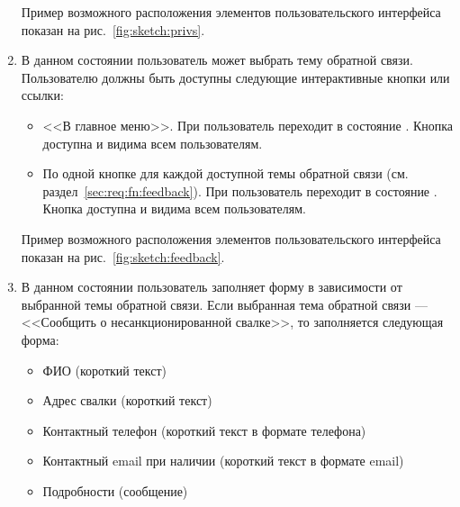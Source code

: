 \begin{enumerate}
            Пример возможного расположения элементов пользовательского интерфейса показан на
            рис.~\ref{fig:sketch:privs}.

        \item \label{itm:req:ui:states:feedback}

            В данном состоянии пользователь может выбрать тему обратной связи.
            Пользователю должны быть доступны следующие интерактивные кнопки или ссылки:
            \begin{itemize}
                \item
                    <<В главное меню>>.
                    При  пользователь переходит в состояние
                    \hyperref[itm:req:ui:states:mainmenu]
                    {}.
                    Кнопка доступна и видима всем пользователям.
                \item
                    По одной кнопке для каждой доступной темы обратной связи
                    (см. раздел~\ref{sec:req:fn:feedback}).
                    При  пользователь переходит в состояние
                    \hyperref[itm:req:ui:states:feedbackx]
                    {}.
                    Кнопка доступна и видима всем пользователям.
            \end{itemize}

            Пример возможного расположения элементов пользовательского интерфейса показан на
            рис.~\ref{fig:sketch:feedback}.

        \item \label{itm:req:ui:states:feedbackx}

            В данном состоянии пользователь заполняет форму в зависимости от выбранной темы
            обратной связи.
            Если выбранная тема обратной связи --- <<Сообщить о несанкционированной свалке>>,
            то заполняется следующая форма:
            \begin{itemize}
                \item
                    ФИО (короткий текст)
                \item
                    Адрес свалки (короткий текст)
                \item
                    Контактный телефон (короткий текст в формате телефона)
                \item
                    Контактный email при наличии (короткий текст в формате email)
                \item
                    Подробности (сообщение)
            \end{itemize}


\end{enumerate}
